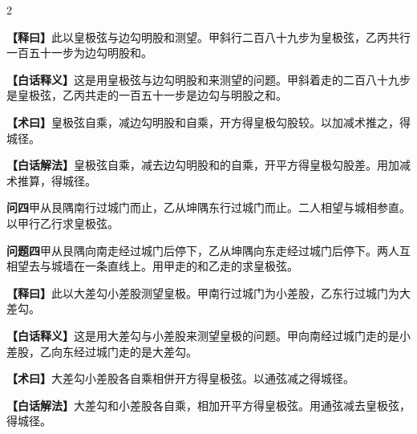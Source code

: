 \documentclass[11pt,a4paper]{article}
\newcommand{\WenQuestion}[1]{\textbf{\textcolor{classicalcolor}{#1}}}
\newcommand{\BaiQuestion}[1]{\textbf{\textcolor{moderncolor}{#1}}}
\newcommand{\WenExplain}{\textcolor{classicalcolor}{\textbf{【释曰】}}}
\newcommand{\BaiExplain}{\textcolor{moderncolor}{\textbf{【白话释义】}}}
\newcommand{\WenMethod}{\textcolor{classicalcolor}{\textbf{【术曰】}}}
\newcommand{\BaiMethod}{\textcolor{moderncolor}{\textbf{【白话解法】}}}
\begin{document}
\begin{paracol}{2}
\switchcolumn*
\begin{tcolorbox}[colback=red!5,colframe=red!30!black,boxrule=0.3pt]
\WenExplain\quad 此以皇极弦与边勾明股和测望。甲斜行二百八十九步为皇极弦，乙丙共行一百五十一步为边勾明股和。
\end{tcolorbox}
\switchcolumn
\begin{tcolorbox}[colback=blue!5,colframe=blue!30!black,boxrule=0.3pt]
\BaiExplain\quad 这是用皇极弦与边勾明股和来测望的问题。甲斜着走的二百八十九步是皇极弦，乙丙共走的一百五十一步是边勾与明股之和。
\end{tcolorbox}

\switchcolumn*
\begin{tcolorbox}[colback=red!5,colframe=red!40!black,boxrule=0.3pt]
\WenMethod\quad 皇极弦自乘，减边勾明股和自乘，开方得皇极勾股较。以加减术推之，得城径。
\end{tcolorbox}
\switchcolumn
\begin{tcolorbox}[colback=blue!5,colframe=blue!40!black,boxrule=0.3pt]
\BaiMethod\quad 皇极弦自乘，减去边勾明股和的自乘，开平方得皇极勾股差。用加减术推算，得城径。
\end{tcolorbox}

\vspace{0.8em}

\switchcolumn*
\begin{tcolorbox}[colback=red!3,colframe=red!30!black,boxrule=0.3pt]
\WenQuestion{问四}\quad 甲从艮隅南行过城门而止，乙从坤隅东行过城门而止。二人相望与城相参直。以甲行乙行求皇极弦。
\end{tcolorbox}
\switchcolumn
\begin{tcolorbox}[colback=blue!3,colframe=blue!30!black,boxrule=0.3pt]
\BaiQuestion{问题四}\quad 甲从艮隅向南走经过城门后停下，乙从坤隅向东走经过城门后停下。两人互相望去与城墙在一条直线上。用甲走的和乙走的求皇极弦。
\end{tcolorbox}

\switchcolumn*
\begin{tcolorbox}[colback=red!5,colframe=red!30!black,boxrule=0.3pt]
\WenExplain\quad 此以大差勾小差股测望皇极。甲南行过城门为小差股，乙东行过城门为大差勾。
\end{tcolorbox}
\switchcolumn
\begin{tcolorbox}[colback=blue!5,colframe=blue!30!black,boxrule=0.3pt]
\BaiExplain\quad 这是用大差勾与小差股来测望皇极的问题。甲向南经过城门走的是小差股，乙向东经过城门走的是大差勾。
\end{tcolorbox}

\switchcolumn*
\begin{tcolorbox}[colback=red!5,colframe=red!40!black,boxrule=0.3pt]
\WenMethod\quad 大差勾小差股各自乘相併开方得皇极弦。以通弦减之得城径。
\end{tcolorbox}
\switchcolumn
\begin{tcolorbox}[colback=blue!5,colframe=blue!40!black,boxrule=0.3pt]
\BaiMethod\quad 大差勾和小差股各自乘，相加开平方得皇极弦。用通弦减去皇极弦，得城径。
\end{tcolorbox}


\end{paracol}
\end{document}
